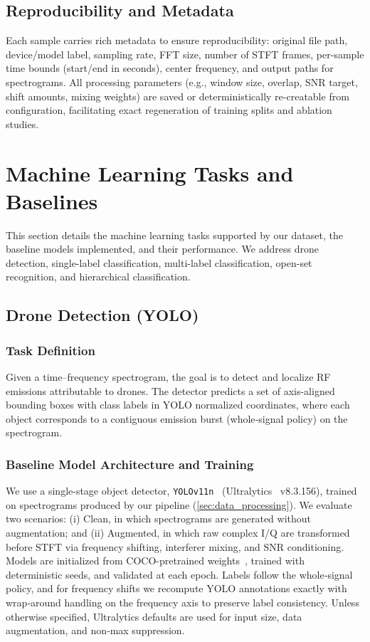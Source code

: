 \subsection{Reproducibility and Metadata}
Each sample carries rich metadata to ensure reproducibility: original file path, device/model label, sampling rate, FFT size, number of STFT frames, per-sample time bounds (start/end in seconds), center frequency, and output paths for spectrograms. All processing parameters (e.g., window size, overlap, SNR target, shift amounts, mixing weights) are saved or deterministically re-creatable from configuration, facilitating exact regeneration of training splits and ablation studies.

\section{Machine Learning Tasks and Baselines}
\label{sec:ml_tasks}
This section details the machine learning tasks supported by our dataset, the baseline models implemented, and their performance. We address drone detection, single-label classification, multi-label classification, open-set recognition, and hierarchical classification.

\subsection{Drone Detection (YOLO)}
\label{subsec:yolo_experiments}

\subsubsection{Task Definition}
Given a time–frequency spectrogram, the goal is to detect and localize RF emissions attributable to drones. The detector predicts a set of axis-aligned bounding boxes with class labels in YOLO normalized coordinates, where each object corresponds to a contiguous emission burst (whole‑signal policy) on the spectrogram.

\subsubsection{Baseline Model Architecture and Training}
We use a single-stage object detector, \texttt{YOLOv11n}~\cite{khanam2024yolov11} (Ultralytics~\cite{jocher2022ultralytics} v8.3.156), trained on spectrograms produced by our pipeline (\cref{sec:data_processing}). We evaluate two scenarios: (i) Clean, in which spectrograms are generated without augmentation; and (ii) Augmented, in which raw complex I/Q are transformed before STFT via frequency shifting, interferer mixing, and SNR conditioning. Models are initialized from COCO-pretrained weights~\cite{lin2014microsoft,jocher2022ultralytics,khanam2024yolov11}, trained with deterministic seeds, and validated at each epoch. Labels follow the whole‑signal policy, and for frequency shifts we recompute YOLO annotations exactly with wrap‑around handling on the frequency axis to preserve label consistency. Unless otherwise specified, Ultralytics defaults are used for input size, data augmentation, and non‑max suppression.

